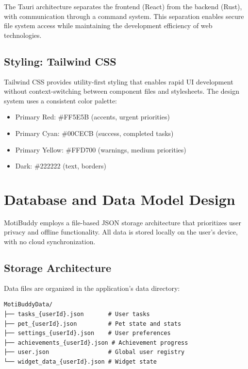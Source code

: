 The Tauri architecture separates the frontend (React) from the backend (Rust), with communication through a command system. This separation enables secure file system access while maintaining the development efficiency of web technologies.

\subsection{Styling: Tailwind CSS}

Tailwind CSS provides utility-first styling that enables rapid UI development without context-switching between component files and stylesheets. The design system uses a consistent color palette:
\begin{itemize}
    \item Primary Red: \#FF5E5B (accents, urgent priorities)
    \item Primary Cyan: \#00CECB (success, completed tasks)
    \item Primary Yellow: \#FFD700 (warnings, medium priorities)
    \item Dark: \#222222 (text, borders)
\end{itemize}

\section{Database and Data Model Design}
\label{sec:data-model}

\completed

MotiBuddy employs a file-based JSON storage architecture that prioritizes user privacy and offline functionality. All data is stored locally on the user's device, with no cloud synchronization.

\subsection{Storage Architecture}

Data files are organized in the application's data directory:

\begin{verbatim}
MotiBuddyData/
├── tasks_{userId}.json       # User tasks
├── pet_{userId}.json         # Pet state and stats
├── settings_{userId}.json    # User preferences
├── achievements_{userId}.json # Achievement progress
├── user.json                 # Global user registry
└── widget_data_{userId}.json # Widget state
\end{verbatim}

